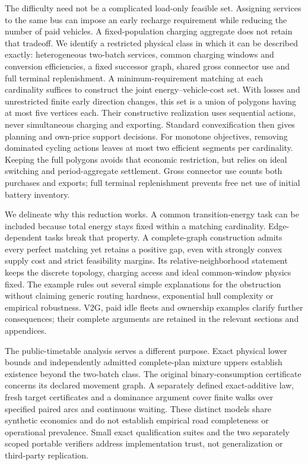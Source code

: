 \documentclass[11pt]{article}
\theoremstyle{definition}\newtheorem{definition}[theorem]{Definition}
\theoremstyle{remark}\newtheorem{remark}[theorem]{Remark}
\begin{document}
The difficulty need not be a complicated load-only feasible set. Assigning
services to the same bus can impose an early recharge requirement while
reducing the number of paid vehicles. A fixed-population charging aggregate
does not retain that tradeoff. We identify a restricted physical class in
which it can be described exactly: heterogeneous two-batch services, common
charging windows and conversion efficiencies, a fixed successor graph, shared
gross connector use and full terminal replenishment. A minimum-requirement
matching at each cardinality suffices to construct the joint energy--vehicle-cost
set. With losses and unrestricted finite early direction changes, this set is
a union of polygons having at most five vertices each. Their constructive
realization uses sequential actions, never simultaneous charging and exporting.
Standard convexification then gives planning and own-price support decisions.
For monotone objectives, removing dominated cycling actions leaves at most two
efficient segments per cardinality. Keeping the full polygons avoids that
economic restriction, but relies on ideal switching and period-aggregate
settlement. Gross connector use counts both purchases and exports; full
terminal replenishment prevents free net use of initial battery inventory.

We delineate why this reduction works. A common transition-energy task can
be included because total energy stays fixed within a matching cardinality.
Edge-dependent tasks break that property. A complete-graph construction
admits every perfect matching yet retains a positive gap, even with strongly
convex supply cost and strict feasibility margins. Its relative-neighborhood
statement keeps the discrete topology, charging access and ideal common-window
physics fixed. The example rules out several simple explanations for the
obstruction without claiming generic routing hardness, exponential hull
complexity or empirical robustness. V2G, paid idle fleets and ownership
examples clarify further consequences; their complete arguments are retained
in the relevant sections and appendices.

The public-timetable analysis serves a different purpose. Exact physical
lower bounds and independently admitted complete-plan mixture uppers establish
existence beyond the two-batch class. The original binary-consumption
certificate concerns its declared movement graph. A separately defined
exact-additive law, fresh target certificates and a dominance argument cover
finite walks over specified paired arcs and continuous waiting. These distinct
models share synthetic economics and do not establish empirical road
completeness or operational prevalence. Small exact qualification suites and
the two separately scoped portable verifiers address implementation trust, not
generalization or third-party replication.
\end{document}

